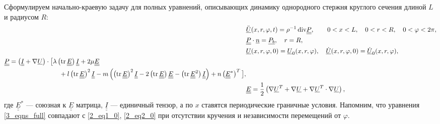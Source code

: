 \documentclass[12pt, a4paper]{report}
\DeclareMathOperator{\trace}{tr}
\newcommand{\lb}{\left (}
\newcommand{\rb}{\right )}
\newcommand{\vect}[1]{\underline{#1}}
\newcommand{\tens}[1]{\underline{\underline{#1}}}
\newcommand{\divg}{\text{div}}
\begin{document}
Сформулируем начально-краевую задачу для полных уравнений, описывающих динамику однородного стержня круглого сечения длиной $L$ и радиусом $R$:
\begin{align}
\label{3_eqns_full}
&\ddot{\vect{U}}(x, r, \varphi, t) = %
\rho^{-1} \,\divg\tens{P}, \qquad 0<x<L, \quad 0<r<R,\quad 0<\varphi<2\pi,\\
\label{3_bc_full}
&\tens{P} \cdot \vect{n} = \vect{P_b}, \quad r = R,\\
\label{3_iv_full}
&\vect{U}(x,r,\varphi,0) = \vect{U}_0(x,r,\varphi), \quad \vect{\dot U}(x,r,\varphi,0) = \vect{\dot U}_0(x,r,\varphi),\\
\label{3_stress}
\begin{split}
&\tens{P} = \lb \tens{I} + \nabla\vect{U} \rb \cdot \big[ \lambda \lb\trace{\tens{E}}\rb \tens{I} + 2\mu \tens{E} \\
& \hspace{30mm}+ l \lb\trace{\tens{E}}\rb^2 \tens{I} - m\lb \lb\trace{\tens{E}}\rb^2\tens{I} - 2\lb\trace{\tens{E}}\rb\tens{E} - \lb\trace{\tens{E}^2}\rb\tens{I}\rb + n\lb\tens{E}^*\rb^T\big],
\end{split}\\
\label{3_strain}
&\tens{E} = \frac12 \lb \nabla\vect{U}^T + \nabla\vect{U} + \nabla\vect{U}^T \cdot \nabla\vect{U} \rb,
\end{align}
где $\tens{E}^*$ --- союзная к $\tens{E}$ матрица, $\tens{I}$ --- единичный тензор, а по $x$ ставятся периодические граничные условия. Напомним, что уравнения \eqref{3_eqns_full} совпадают с \eqref{2_eq1_0}, \eqref{2_eq2_0} при отсутствии кручения и независимости перемещений от $\varphi$.
\end{document}

